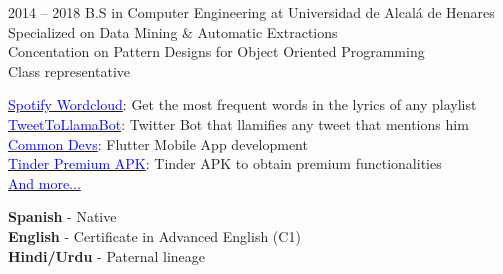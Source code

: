 \documentclass[9pt]{developercv} %
\begin{document}
\begin{entrylist}
	\entry
		{2014 -- 2018}
		{B.S in Computer Engineering at Universidad de Alcalá de Henares} 
		{}
		{\\Specialized on Data Mining \& Automatic Extractions\\Concentation on Pattern Designs for Object Oriented Programming\\Class representative}
\end{entrylist}



\begin{minipage}[t]{0.7\textwidth}  
	\vspace{-\baselineskip} %


	\href{https://spotifycloud.zamar-roura.com}{\textcolor{blue}{Spotify Wordcloud}}: Get the most frequent words in the lyrics of any playlist \\
	\href{https://twitter.com/TweetToLlamaBot}{\textcolor{blue}{TweetToLlamaBot}}: Twitter Bot that llamifies any tweet that mentions him \\
	\href{https://www.commondevs.com}{\textcolor{blue}{Common Devs}}: Flutter Mobile App development \\
	\href{https://github.com/zamar-roura/tinder-adventures}{\textcolor{blue}{Tinder Premium APK}}: Tinder APK to obtain premium functionalities \\
	\href{https://zamar-roura.com/projects}{\textcolor{blue}{And more...}}\\
\end{minipage}
\begin{minipage}[t]{0.3\textwidth}
	\vspace{-\baselineskip} %
	
	\textbf{Spanish} - Native\\
	\textbf{English} - Certificate in Advanced English (C1)\\
	\textbf{Hindi/Urdu} - Paternal lineage \\

\end{minipage}



\end{document}
